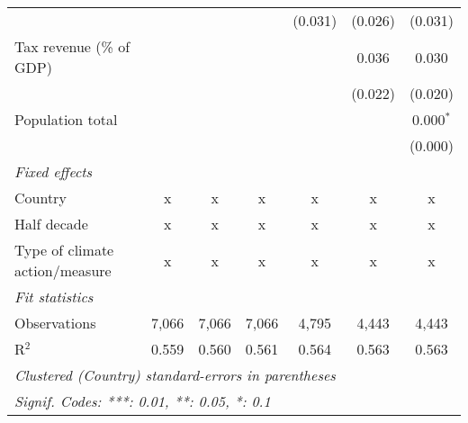 \begin{tabular}{lcccccc}
                                                           &         &                &                & (0.031)        & (0.026)        & (0.031)\\   
   Tax revenue (\% of GDP)                                 &         &                &                &                & 0.036          & 0.030\\   
                                                           &         &                &                &                & (0.022)        & (0.020)\\   
   Population total                                        &         &                &                &                &                & 0.000$^{*}$\\   
                                                           &         &                &                &                &                & (0.000)\\   
   \emph{Fixed effects}\\
   Country                                                 & x       & x              & x              & x              & x              & x\\  
   Half decade                                             & x       & x              & x              & x              & x              & x\\  
   Type of climate action/measure                          & x       & x              & x              & x              & x              & x\\  
   \midrule \emph{Fit statistics}\\
   Observations                                            & 7,066   & 7,066          & 7,066          & 4,795          & 4,443          & 4,443\\  
   R$^2$                                                   & 0.559   & 0.560          & 0.561          & 0.564          & 0.563          & 0.563\\  
   \midrule
   \multicolumn{7}{l}{\emph{Clustered (Country) standard-errors in parentheses}}\\
   \multicolumn{7}{l}{\emph{Signif. Codes: ***: 0.01, **: 0.05, *: 0.1}}\\
\end{tabular}
\par\endgroup


